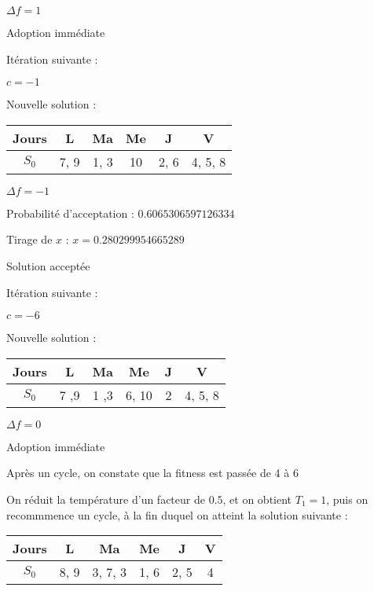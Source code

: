 {$\Delta f = 1$

Adoption immédiate

Itération suivante :

$c = -1$

Nouvelle solution : 

\begin{table}[!h]
    \centering
    \begin{tabular}{|c|c|c|c|c|c|}
        \hline
        Jours & L    & Ma    & Me   & J    & V    \\
        \hline
        $S_0$ & 7, 9 & 1, 3 & 10 & 2, 6 & 4, 5, 8 \\
        \hline
    \end{tabular}
\end{table}

$\Delta f = -1$

Probabilité d'acceptation : $0.6065306597126334$

Tirage de $x$ :
$x = 0.280299954665289$

Solution acceptée

Itération suivante :

$c = -6$

Nouvelle solution : 

\begin{table}[!h]
    \centering
    \begin{tabular}{|c|c|c|c|c|c|}
        \hline
        Jours & L    & Ma    & Me   & J    & V    \\
        \hline
        $S_0$ & 7 ,9 & 1 ,3 & 6, 10 & 2 & 4, 5, 8 \\
        \hline
    \end{tabular}
\end{table}

$\Delta f = 0$

Adoption immédiate

Après un cycle, on constate que la fitness est passée de 4 à 6

On réduit la température d'un facteur de $0.5$, et on obtient $T_1 = 1$, puis on recommmence un cycle, à la fin duquel on atteint la solution suivante :

\begin{table}[!h]
    \centering
    \begin{tabular}{|c|c|c|c|c|c|}
        \hline
        Jours & L    & Ma    & Me   & J    & V    \\
        \hline
        $S_0$ & 8, 9 & 3, 7, 3 & 1, 6 & 2, 5 & 4 \\
        \hline
    \end{tabular}
\end{table}

}
